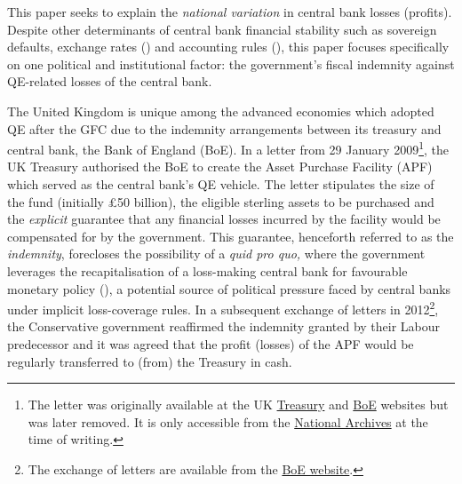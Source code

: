 \documentclass[
  a4paper,
  abstract=true]{scrartcl}
\theoremstyle{definition}
\begin{document}
This paper seeks to explain the \emph{national variation} in central
bank losses (profits). Despite other determinants of central bank
financial stability such as sovereign defaults, exchange rates
() and accounting rules
(), this paper
focuses specifically on one political and institutional factor: the
government's fiscal indemnity against QE-related losses of the central
bank.

The United Kingdom is unique among the advanced economies which adopted
QE after the GFC due to the indemnity arrangements between its treasury
and central bank, the Bank of England (BoE). In a letter from 29 January
2009\footnote{The letter was originally available at the UK
  \href{http://www.hm-treasury.gov.uk/d/ck_letter_boe290109.pdf}{Treasury}
  and
  \href{http://www.bankofengland.co.uk/markets/apfgovletter090129.pdf}{BoE}
  websites but was later removed. It is only accessible from the
  \href{https://webarchive.nationalarchives.gov.uk/ukgwa/+/http:/www.hm-treasury.gov.uk/d/ck_letter_boe290109.pdf}{National
  Archives} at the time of writing.}, the UK Treasury authorised the BoE
to create the Asset Purchase Facility (APF) which served as the central
bank's QE vehicle. The letter stipulates the size of the fund (initially
£50 billion), the eligible sterling assets to be purchased and the
\emph{explicit} guarantee that any financial losses incurred by the
facility would be compensated for by the government. This guarantee,
henceforth referred to as the \emph{indemnity}, forecloses the
possibility of a \emph{quid pro quo,} where the government leverages the
recapitalisation of a loss-making central bank for favourable monetary
policy (), a potential source of
political pressure faced by central banks under implicit loss-coverage
rules. In a subsequent exchange of letters in 2012\footnote{The exchange
  of letters are available from the
  \href{https://www.bankofengland.co.uk/letter/2012/apf-excess-letter-november-2012}{BoE
  website}.}, the Conservative government reaffirmed the indemnity
granted by their Labour predecessor and it was agreed that the profit
(losses) of the APF would be regularly transferred to (from) the
Treasury in cash.
\end{document}
